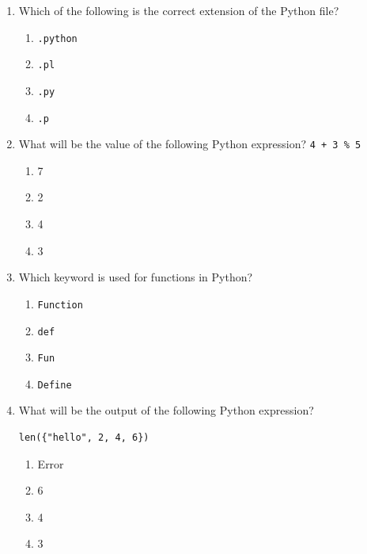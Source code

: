 \documentclass[11pt,a4paper]{article}
\begin{document}
\begin{enumerate}[label=(\roman*),leftmargin=*,itemsep=8pt]

  \item Which of the following is the correct extension of the Python file?
  
\begin{enumerate}[label=(\alph*),itemsep=2pt]
    \item   \texttt{.python}
    \item   \texttt{.pl}
    \item   \texttt{.py}
    \item   \texttt{.p}
  \end{enumerate}

  \item What will be the value of the following Python expression? \quad   \texttt{4 + 3 \% 5}
  
\begin{enumerate}[label=(\alph*),itemsep=2pt]
    \item 7
    \item 2
    \item 4
    \item 3
  \end{enumerate}

  \item Which keyword is used for functions in Python?
  
\begin{enumerate}[label=(\alph*),itemsep=2pt]
    \item   \texttt{Function}
    \item   \texttt{def}
    \item   \texttt{Fun}
    \item   \texttt{Define}
  \end{enumerate}

  \item What will be the output of the following Python expression?
  
\begin{lstlisting}
len({"hello", 2, 4, 6})
  \end{lstlisting}
  
\begin{enumerate}[label=(\alph*),itemsep=2pt]
    \item Error
    \item 6
    \item 4
    \item 3
  \end{enumerate}


\end{enumerate}
\end{document}
